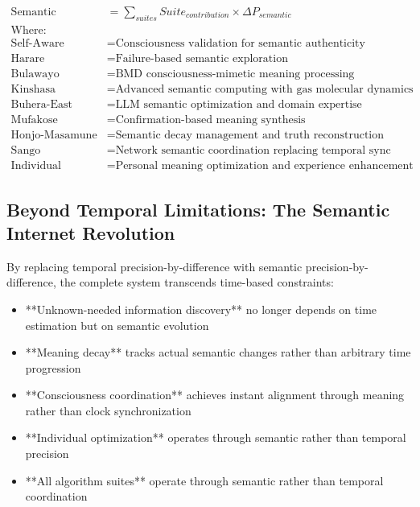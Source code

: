 \documentclass[12pt,a4paper]{article}
\begin{document}
\begin{algorithm}
\begin{algorithmic}[1]
\begin{align}
\text{Semantic Internet} &= \sum_{suites} Suite_{contribution} \times \Delta P_{semantic} \\
\text{Where:} \quad &\\
\text{Self-Aware} &= \text{Consciousness validation for semantic authenticity} \\
\text{Harare} &= \text{Failure-based semantic exploration} \\
\text{Bulawayo} &= \text{BMD consciousness-mimetic meaning processing} \\
\text{Kinshasa} &= \text{Advanced semantic computing with gas molecular dynamics} \\
\text{Buhera-East} &= \text{LLM semantic optimization and domain expertise} \\
\text{Mufakose} &= \text{Confirmation-based meaning synthesis} \\
\text{Honjo-Masamune} &= \text{Semantic decay management and truth reconstruction} \\
\text{Sango} &= \text{Network semantic coordination replacing temporal sync} \\
\text{Individual} &= \text{Personal meaning optimization and experience enhancement}
\end{align}

\subsection{Beyond Temporal Limitations: The Semantic Internet Revolution}

By replacing temporal precision-by-difference with semantic precision-by-difference, the complete system transcends time-based constraints:

\begin{itemize}
\item **Unknown-needed information discovery** no longer depends on time estimation but on semantic evolution
\item **Meaning decay** tracks actual semantic changes rather than arbitrary time progression  
\item **Consciousness coordination** achieves instant alignment through meaning rather than clock synchronization
\item **Individual optimization** operates through semantic rather than temporal precision
\item **All algorithm suites** operate through semantic rather than temporal coordination
\end{itemize}


\end{algorithmic}
\end{algorithm}
\end{document}
